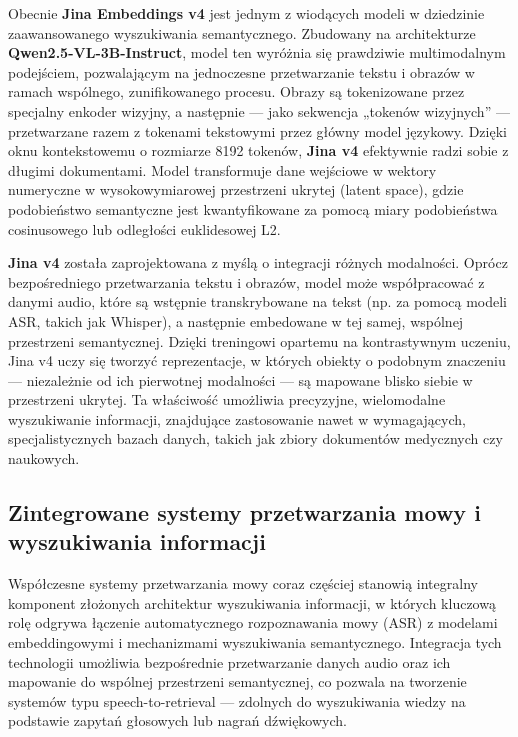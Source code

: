Obecnie \textbf{Jina Embeddings v4}\cite{jina_v4} jest jednym z wiodących modeli w dziedzinie zaawansowanego wyszukiwania semantycznego. Zbudowany na architekturze \textbf{Qwen2.5-VL-3B-Instruct}\cite{qwen2.5-VL}, model ten wyróżnia się prawdziwie multimodalnym podejściem, pozwalającym na jednoczesne przetwarzanie tekstu i obrazów w ramach wspólnego, zunifikowanego procesu. Obrazy są tokenizowane przez specjalny enkoder wizyjny, a następnie — jako sekwencja „tokenów wizyjnych” — przetwarzane razem z tokenami tekstowymi przez główny model językowy. Dzięki oknu kontekstowemu o rozmiarze 8192 tokenów, \textbf{Jina v4} efektywnie radzi sobie z długimi dokumentami. Model transformuje dane wejściowe w wektory numeryczne w wysokowymiarowej przestrzeni ukrytej (latent space), gdzie podobieństwo semantyczne jest kwantyfikowane za pomocą miary podobieństwa cosinusowego lub odległości euklidesowej L2.

\textbf{Jina v4}\cite{jina_v4} została zaprojektowana z myślą o integracji różnych modalności. Oprócz bezpośredniego przetwarzania tekstu i obrazów, model może współpracować z danymi audio, które są wstępnie transkrybowane na tekst (np. za pomocą modeli ASR, takich jak Whisper), a następnie embedowane w tej samej, wspólnej przestrzeni semantycznej. Dzięki treningowi opartemu na kontrastywnym uczeniu, Jina v4 uczy się tworzyć reprezentacje, w których obiekty o podobnym znaczeniu — niezależnie od ich pierwotnej modalności — są mapowane blisko siebie w przestrzeni ukrytej. Ta właściwość umożliwia precyzyjne, wielomodalne wyszukiwanie informacji, znajdujące zastosowanie nawet w wymagających, specjalistycznych bazach danych, takich jak zbiory dokumentów medycznych czy naukowych.



\subsection{Zintegrowane systemy przetwarzania mowy i wyszukiwania informacji}
Współczesne systemy przetwarzania mowy coraz częściej stanowią integralny komponent złożonych architektur wyszukiwania informacji, w których kluczową rolę odgrywa łączenie automatycznego rozpoznawania mowy (ASR) z modelami embeddingowymi i mechanizmami wyszukiwania semantycznego. Integracja tych technologii umożliwia bezpośrednie przetwarzanie danych audio oraz ich mapowanie do wspólnej przestrzeni semantycznej, co pozwala na tworzenie systemów typu speech-to-retrieval — zdolnych do wyszukiwania wiedzy na podstawie zapytań głosowych lub nagrań dźwiękowych.

